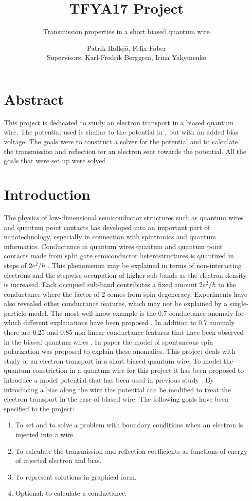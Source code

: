\documentclass[a4paper]{article}
\subtitle{Transmission properties in a short biased quantum wire}
\title{TFYA17 Project}
\author{Patrik Hallsj\"{o}, Felix Faber \\ Supervisors: Karl-Fredrik Berggren, Irina Yakymenko}
\date{}
\begin{document}
\maketitle

\section*{Abstract}
This project is dedicated to study an electron transport in a biased quantum wire. The potential used is similar to the potential in \cite{5}, but with an added bias voltage. The goals were to construct a solver for the potential and to calculate the transmission and reflection for an electron sent towards the potential. All the goals that were set up were solved.

\newpage
\section{Introduction}
The physics of low-dimensional semiconductor structures such as quantum wires and quantum point contacts has developed into an important part of nanotechnology, especially in connection with spintronics and quantum informatics.
Conductance in quantum wires quantum and quantum point contacts  made from split gate semiconductor heterostructures is quantized in steps of $2e^2/h$ \cite{1}.
This phenomenon may be explained in terms of non-interacting electrons and the stepwise occupation of higher sub-bands as the electron density is increased.
Each occupied sub-band contributes a fixed amount $2e^2 /h$  to the conductance where the factor of 2 comes from spin degeneracy.
Experiments have also revealed other conductance features, which may not be explained by a single-particle model.
The most well-know example is the 0.7 conductance anomaly  for which different explanations have been proposed \cite{2}.  In addition to 0.7 anomaly there are  0.25 and 0.85 non-linear conductance features that have been observed in the biased quantum wires \cite{3}.
In paper \cite{4} the model of spontaneous spin polarization was proposed to explain these anomalies.
This project deals with study of an electron transport in a short biased quantum wire. To model the quantum constriction in a quantum wire for this project it has been proposed to introduce a model potential that has been used in previous study \cite{5}.
By introducing a bias along the wire this potential can be modified to treat the electron transport in the case of biased wire.
The following goals have been specified to the project:
\begin{enumerate}
\item To set and to solve a problem with boundary conditions when an electron is injected into a wire.
\item To calculate the transmission and reflection coefficients as functions of energy of injected electron and bias.
\item To represent solutions in graphical form.
\item Optional: to calculate a conductance.
\end{enumerate}
\end{document}

